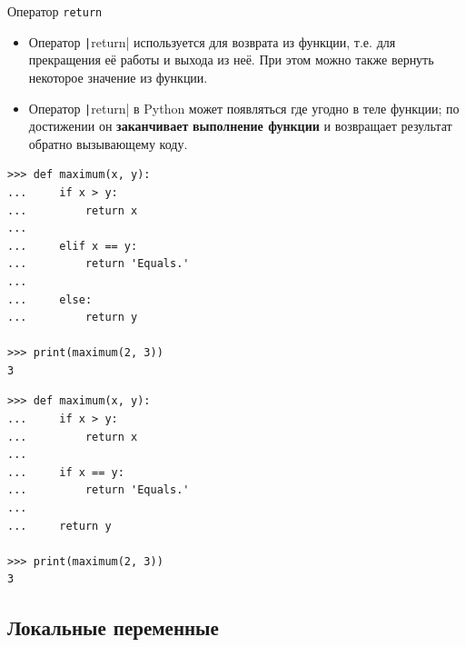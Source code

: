 \documentclass[aspectratio=169, mathserif]{beamer}%
\begin{document}
\begin{frame}[fragile]{Оператор \texttt{return}}
\scriptsize
\begin{itemize}
\item Оператор \texttt|return| используется для возврата из функции, т.е. для прекращения её работы и выхода из неё. При этом можно также вернуть некоторое значение из функции.
\item Оператор \texttt|return| в Python может появляться где угодно в теле функции; по достижении он \textbf{заканчивает} \textbf{выполнение функции} и возвращает результат обратно вызывающему коду.
\end{itemize}

\begin{minipage}{.47\textwidth}
\begin{verbatim}
>>> def maximum(x, y): 
...     if x > y:
...         return x
...
...     elif x == y:
...         return 'Equals.' 
...     
...     else:
...         return y

>>> print(maximum(2, 3))
3
\end{verbatim}
\end{minipage}
\begin{minipage}{.05\textwidth}
\hspace{.1ex}
\end{minipage}
\begin{minipage}{.47\textwidth}
\begin{verbatim}
>>> def maximum(x, y): 
...     if x > y:
...         return x
...
...     if x == y:
...         return 'Equals.' 
...
...     return y

>>> print(maximum(2, 3))
3
\end{verbatim}
\vspace{.08ex}
\end{minipage}
\vfill
\end{frame}


\subsection{Локальные переменные}
\end{document}
